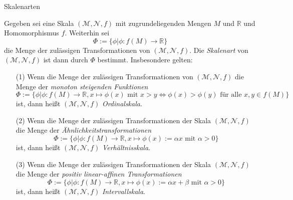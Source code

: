 \documentclass[
  8pt,
  ignorenonframetext,
]{beamer}
\begin{document}
\begin{frame}{Skalenarten}
\protect\hypertarget{skalenarten}{}
\footnotesize
\begin{definition}[Skalenarten]
\justifying
Gegeben sei eine Skala $(\mathcal{M},\mathcal{N},f)$ mit zugrundeliegenden Mengen
$M$ und $\mathbb{R}$ und Homomorphismus $f$. Weiterhin sei 
\begin{equation}
\Phi := \{\phi| \phi : f(M) \to \mathbb{R} \}
\end{equation}
die Menge der zulässigen Transformationen von $(\mathcal{M},\mathcal{N},f)$. Die \textit{Skalenart} 
von $(\mathcal{M},\mathcal{N},f)$  ist dann durch $\Phi$ bestimmt. Insbesondere gelten: 
\begin{itemize}
\item[(1)] Wenn die Menge der zulässigen Transformationen von 
$(\mathcal{M},\mathcal{N},f)$ die Menge der \textit{monoton steigenden Funktionen} 
\begin{equation}
\Phi := \{\phi| \phi : f(M) \to \mathbb{R}, x \mapsto \phi(x)  \mbox{ mit } x > y \Leftrightarrow \phi(x) > \phi(y) \mbox{ für alle } x,y \in f(M)\}
\end{equation}
ist, dann heißt $(\mathcal{M},\mathcal{N},f)$ \textit{Ordinalskala}.
\item[(2)] Wenn die Menge der zulässigen
Transformationen der Skala $(\mathcal{M},\mathcal{N},f)$ die Menge der 
\textit{Ähnlichkeitstransformationen}
\begin{equation}
\Phi := \{\phi| \phi : f(M) \to \mathbb{R}, x \mapsto \phi(x) := \alpha x \mbox{ mit } \alpha > 0\}
\end{equation}
ist, dann heißt $(\mathcal{M},\mathcal{N},f)$ \textit{Verhältnisskala}.
\item[(3)] Wenn die Menge der zulässigen
Transformationen der Skala $(\mathcal{M},\mathcal{N},f)$ die Menge der 
\textit{positiv linear-affinen Transformationen}
\begin{equation}
\Phi := \{\phi| \phi : f(M) \to \mathbb{R}, x \mapsto \phi(x) := \alpha x + \beta  \mbox{ mit } \alpha > 0\}
\end{equation}
ist, dann heißt $(\mathcal{M},\mathcal{N},f)$ \textit{Intervallskala}.
\end{itemize}
\end{definition}
\end{frame}
\end{document}
